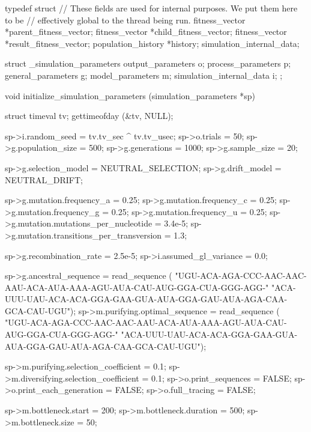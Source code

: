\documentclass{article}
\begin{document}
\begin{ccode}
typedef struct {
  // These fields are used for internal purposes. We put them here to be
  // effectively global to the thread being run.
  fitness_vector	*parent_fitness_vector;
  fitness_vector	*child_fitness_vector;
  fitness_vector	*result_fitness_vector;
  population_history	*history;
} simulation_internal_data;

struct _simulation_parameters {
  output_parameters		o;
  process_parameters		p;
  general_parameters		g;
  model_parameters		m;
  simulation_internal_data	i;
};

void initialize_simulation_parameters (simulation_parameters *sp) {
  struct timeval tv;
  gettimeofday (&tv, NULL);

  sp->i.random_seed                          = tv.tv_sec ^ tv.tv_usec;
  sp->o.trials                     = 50;
  sp->g.population_size                      = 500;
  sp->g.generations                          = 1000;
  sp->g.sample_size                          = 20;

  sp->g.selection_model                      = NEUTRAL_SELECTION;
  sp->g.drift_model                          = NEUTRAL_DRIFT;

  sp->g.mutation.frequency_a      = 0.25;
  sp->g.mutation.frequency_c      = 0.25;
  sp->g.mutation.frequency_g      = 0.25;
  sp->g.mutation.frequency_u      = 0.25;
  sp->g.mutation.mutations_per_nucleotide = 3.4e-5;
  sp->g.mutation.transitions_per_transversion = 1.3;

  sp->g.recombination_rate                   = 2.5e-5;
  sp->i.assumed_gl_variance                  = 0.0;

  sp->g.ancestral_sequence = read_sequence (
    "UGU-ACA-AGA-CCC-AAC-AAC-AAU-ACA-AUA-AAA-AGU-AUA-CAU-AUG-GGA-CUA-GGG-AGG-"
    "ACA-UUU-UAU-ACA-ACA-GGA-GAA-GUA-AUA-GGA-GAU-AUA-AGA-CAA-GCA-CAU-UGU");
  sp->m.purifying.optimal_sequence = read_sequence (
    "UGU-ACA-AGA-CCC-AAC-AAC-AAU-ACA-AUA-AAA-AGU-AUA-CAU-AUG-GGA-CUA-GGG-AGG-"
    "ACA-UUU-UAU-ACA-ACA-GGA-GAA-GUA-AUA-GGA-GAU-AUA-AGA-CAA-GCA-CAU-UGU");

  sp->m.purifying.selection_coefficient      = 0.1;
  sp->m.diversifying.selection_coefficient = 0.1;
  sp->o.print_sequences                      = FALSE;
  sp->o.print_each_generation                = FALSE;
  sp->o.full_tracing                         = FALSE;

  sp->m.bottleneck.start               = 200;
  sp->m.bottleneck.duration            = 500;
  sp->m.bottleneck.size                = 50;

}
\end{ccode}
\end{document}
